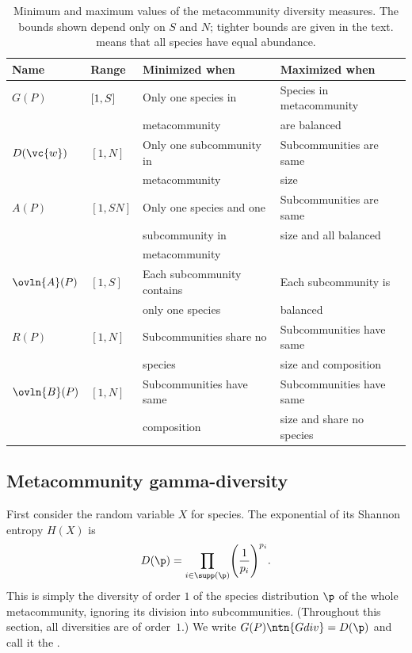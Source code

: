 \begin{table}
\centering
\begin{tabular}{|l|l|l|l|}
\hline
Name            &
Range           &
Minimized when  &
Maximized when  \\
\hline
$G(P)$          &
$[1, S]\vphantom{X^{X^X}}$        &
Only one species in        &
Species in metacommunity    \\
&
&
metacommunity       &
are balanced        \\[1ex]
$D(\vc{w})$     &
$[1, N]$        &
Only one subcommunity in  &
Subcommunities are same \\
&
&
metacommunity        &
size    \\[1ex]
$A(P)$          &
$[1, SN]$       &
Only one species and one        &
Subcommunities are same     \\
&
&
subcommunity in&
size and all balanced        \\
&
&
metacommunity&
\\[1ex]
$\ovln{A}(P)$   &
$[1, S]$        &
Each subcommunity contains      &
Each subcommunity is  \\
&
&
only one species        &
balanced        \\[1ex]
$R(P)$          &
$[1, N]$        &
Subcommunities share no         &
Subcommunities have same    \\
&
&
species &
size and composition    \\[1ex]
$\ovln{B}(P)$   &
$[1, N]$        &
Subcommunities have same        &
Subcommunities have same   \\
&
&
composition     &
size and share no species    \\
\hline
\end{tabular}
\caption{Minimum and maximum values of the metacommunity diversity
  measures.  The bounds shown depend only on $S$ and $N$; tighter bounds
  are given in the text.
   means that all species have equal
  abundance.}  
\end{table}


\subsection*{Metacommunity gamma-diversity}

First consider the random variable $X$ for species.  The exponential of its
Shannon entropy $H(X)$ is 
\[
D(\p)
=
\prod_{i \in \supp(\p)} \Biggl( \frac{1}{p_i} \Biggr)^{p_i}.
\]
This is simply the diversity of order $1$ of the species distribution $\p$
of the whole metacommunity, ignoring its division into subcommunities.
(Throughout this section, all diversities are of order~$1$.)  We write
$G(P)\ntn{Gdiv} = D(\p)$ and call it the .%
%
%

